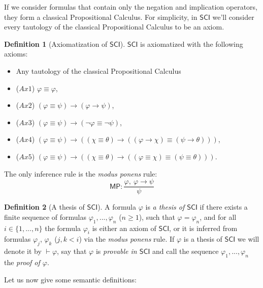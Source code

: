 \documentclass{article}
\theoremstyle{definition}
\newtheorem{definition}{Definition}[section]
\theoremstyle{definition}
\newcommand*{\id}{\equiv}
\newcommand*{\ra}{\rightarrow}
\newcommand{\SCI}{$\mathsf{SCI}$\xspace}
\begin{document}
If we consider formulas that contain only the negation and implication
operators, they form a classical Propositional Calculus. For simplicity, in
\SCI we'll consider every tautology of the classical Propositional Calculus to
be an axiom.

\begin{definition}[Axiomatization of \SCI]
    \label{axiomatization}
    \SCI is axiomatized with the following axioms:
    \begin{itemize}
        \item Any tautology of the classical Propositional Calculus
        \item ($Ax1$) $\varphi \id \varphi$,
        \item ($Ax2$) $(\varphi \id \psi) \ra (\varphi \ra \psi)$,
        \item ($Ax3$) $(\varphi \id \psi) \ra (\lnot \varphi \id \lnot \psi)$,
        \item ($Ax4$) $(\varphi \id \psi) \ra ((\chi \id \theta) \ra ((\varphi \ra \chi) \id (\psi \ra \theta)))$,
        \item ($Ax5$) $(\varphi \id \psi) \ra ((\chi \id \theta) \ra ((\varphi \id \chi) \id (\psi \id \theta)))$.
    \end{itemize}
    The only inference rule is the \emph{modus ponens} rule:
    $$
        \mathsf{MP}: \frac{
            \varphi, \ \varphi \ra \psi}%
        { \psi }
    $$
\end{definition}

\begin{definition}[A thesis of \SCI]
    A formula $\varphi$ is \emph{a thesis of \SCI} if there exists a finite sequence of formulas $\varphi_1, ..., \varphi_n$ ($n \geq 1$), such that $\varphi = \varphi_n$, and for all $i \in \{1, ..., n\}$ the formula $\varphi_i$ is either an axiom of \SCI, or it is inferred from formulas $\varphi_j$, $\varphi_k$ ($j, k <i$) via the \emph{modus ponens} rule. If $\varphi$ is a thesis of \SCI we will denote it by $\vdash \varphi$, say that $\varphi$ is \emph{provable in \SCI} and call the sequence $\varphi_1, ..., \varphi_n$ the \emph{proof of $\varphi$}.
    \label{thesis}
\end{definition}

Let us now give some semantic definitions:
\end{document}
